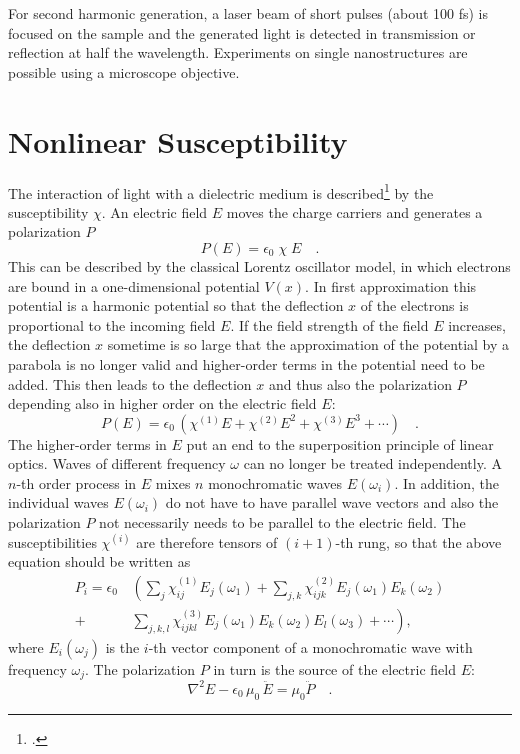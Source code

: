 For second harmonic generation, a laser beam of short pulses (about 100 fs) is focused on the sample and the generated light is detected in transmission or reflection at half the wavelength. Experiments on single nanostructures are possible using a microscope objective.

\section{Nonlinear Susceptibility}

The interaction of light with a dielectric medium is described\footcite{MilonniEberly1988,Yariv1989} by the  susceptibility $\chi$.
An electric field $E$ moves the
charge carriers and generates a polarization $P$
\begin{equation}
  P(E) = \epsilon_0 \; \chi \; E \quad.
\end{equation}
This can be described by the classical Lorentz oscillator model,
in which electrons are bound  in a one-dimensional potential $V(x)$. In first approximation this potential is a
harmonic potential so that the deflection
$x$ of the electrons is proportional to the incoming field $E$.
If the field strength of the field $E$ increases, the deflection
$x$ sometime is so large that the approximation of the potential by a
parabola is no longer valid and higher-order terms in the
potential need to be added. This then leads to the deflection
$x$ and thus also the polarization $P$ depending also in higher
order  on the electric field $E$:
\begin{equation}
  P(E) = \epsilon_0 \, \left( \chi^{(1)} E + \chi^{(2)} E^2 + \chi^{(3)}
  E^3 + \cdots \right)  \quad .
\end{equation}
The higher-order terms in $E$  put an end to the 
superposition principle of linear optics. Waves of different
frequency $\omega$ can no longer be treated independently.
A $n$-th order process in $E$ mixes $n$ monochromatic
waves $E(\omega_i)$. In addition, the individual waves
$E(\omega_i)$ do not have to have parallel wave vectors and also the
polarization $P$ not necessarily needs to be parallel to the electric field. The susceptibilities $\chi^{(i)}$ are therefore tensors of
$(i+1)$-th rung, so that the above equation
 should be written as
\begin{align}
  P_i = \epsilon_0 \, & \left(  \sum_j \chi^{(1)}_{ij} E_j(\omega_1)
     + \sum_{j,k} \chi^{(2)}_{ijk} E_j(\omega_1) E_k(\omega_2)  \right. \nonumber \\+
     & \left.
    \sum_{j,k,l} \chi^{(3)}_{ijkl} E_j(\omega_1) E_k(\omega_2) E_l(\omega_3) + \cdots \right)  ,
\end{align}
where $E_i(\omega_j)$ is the $i$-th vector component of a
monochromatic wave with frequency $\omega_j$. The
polarization $P$ in turn is the source of the electric field $E$:
\begin{equation}
   \nabla^2 E - \epsilon_0 \, \mu_0 \, \ddot{E} = \mu_0 \ddot{P}  \quad .
   \label{eq:shg_wave_equation}
\end{equation}

